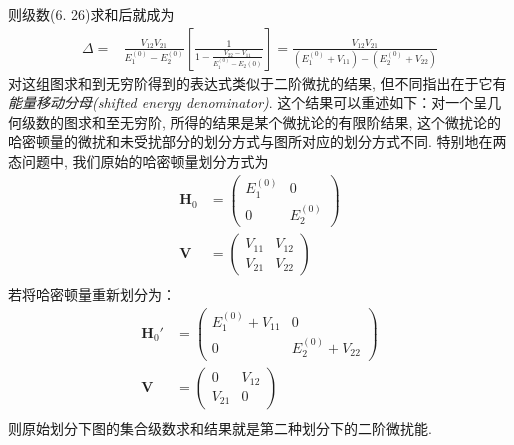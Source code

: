 则级数(6.
26)求和后就成为
\begin{align}
\Delta = &  \frac{V_{12}V_{21}}{E^{(0)}_1 - E_2^{(0)}}\left[ \frac{1}{1-\frac{V_{22}-V_{11}}{E_1^{(0)} - E_2{(0)}}} \right] = \frac{V_{12}V_{21}}{(E_1^{(0)} + V_{11}) - (E_2^{(0)} + V_{22})}
\end{align}
对这组图求和到无穷阶得到的表达式类似于二阶微扰的结果, 
但不同指出在于它有\emph{能量移动分母(shifted energy denominator)}. 
这个结果可以重述如下：对一个呈几何级数的图求和至无穷阶, 
所得的结果是某个微扰论的有限阶结果, 
这个微扰论的哈密顿量的微扰和未受扰部分的划分方式与图所对应的划分方式不同. 
特别地在两态问题中, 
我们原始的哈密顿量划分方式为
\begin{align*}
\mathbf{H}_0 & = \begin{pmatrix}
E_1^{(0)} & 0 \\
0         & E_2^{(0)}
\end{pmatrix}\\
\mathbf{V} & = \begin{pmatrix}
V_{11} & V_{12} \\
V_{21} & V_{22}
\end{pmatrix}\\
\end{align*} 
若将哈密顿量重新划分为：
\begin{align*}
\mathbf{H}_0' & = \begin{pmatrix}
E_1^{(0)} + V_{11} & 0 \\
0        & E_2^{(0)} + V_{22}
\end{pmatrix}\\
\mathbf{V} & = \begin{pmatrix}
0 & V_{12} \\
V_{21} & 0
\end{pmatrix}\\
\end{align*} 
则原始划分下图的集合级数求和结果就是第二种划分下的二阶微扰能.


